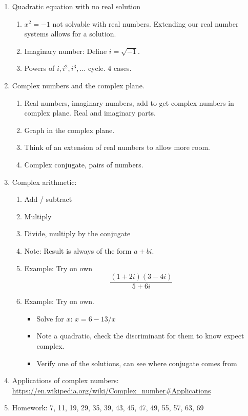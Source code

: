 \documentclass{article}
\begin{document}
\begin{enumerate}
\item Quadratic equation with no real solution
\begin{enumerate}
\item $x^2 = -1$ not solvable with real numbers. Extending our real number systems allows for a solution. 
\item Imaginary number: Define $i = \sqrt{-1}$.
\item Powers of $i, i^2, i^3,...$ cycle. 4 cases.
\end{enumerate}

\item Complex numbers and the complex plane.
\begin{enumerate}
\item Real numbers, imaginary numbers, add to get complex numbers in complex plane. Real and imaginary parts.
\item Graph in the complex plane.
\item Think of an extension of real numbers to allow more room. 
\item Complex conjugate, pairs of numbers.
\end{enumerate}

\item Complex arithmetic:
\begin{enumerate}
\item Add / subtract
\item Multiply
\item Divide, multiply by the conjugate
\item Note: Result is always of the form $a+bi$.
\item Example: Try on own
\[
\frac{(1+2i)(3-4i)}{5+6i}
\]
\item Example: Try on own.
\begin{itemize}
\item Solve for $x$: $x=6-13/x$
\item Note a quadratic, check the discriminant for them to know expect complex.
\item Verify one of the solutions, can see where conjugate comes from
\end{itemize}
\end{enumerate}

\item Applications of complex numbers: \url{https://en.wikipedia.org/wiki/Complex_number#Applications}

\item Homework: 7, 11, 19, 29, 35, 39, 43, 45, 47, 49, 55, 57, 63, 69

\end{enumerate}
\end{document}
